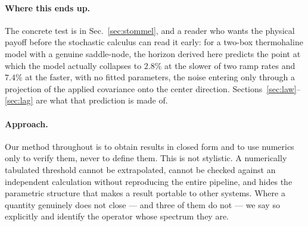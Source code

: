 \documentclass[%
 aip,
 cha,
 amsmath,amssymb,
 reprint,
 superscriptaddress,
 floatfix,
]{revtex4-2}
\begin{document}
\paragraph{Where this ends up.}
The concrete test is in Sec.~\ref{sec:stommel}, and a reader who wants the physical payoff before the stochastic calculus can read it early: for a two-box thermohaline model with a genuine saddle-node, the horizon derived here predicts the point at which the model actually collapses to $2.8\%$ at the slower of two ramp rates and $7.4\%$ at the faster, with no fitted parameters, the noise entering only through a projection of the applied covariance onto the center direction.  Sections~\ref{sec:law}--\ref{sec:lag} are what that prediction is made of.

\paragraph{Approach.}
Our method throughout is to obtain results in closed form and to use numerics only to verify them, never to define them.  This is not stylistic.  A numerically tabulated threshold cannot be extrapolated, cannot be checked against an independent calculation without reproducing the entire pipeline, and hides the parametric structure that makes a result portable to other systems.  Where a quantity genuinely does not close --- and three of them do not --- we say so explicitly and identify the operator whose spectrum they are.
\end{document}
